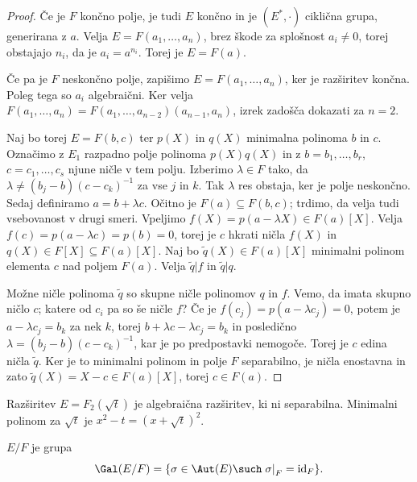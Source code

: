 \begin{proof}
  Če je $F$ končno polje, je tudi $E$ končno in je $(E^*, \cdot)$ ciklična
  grupa, generirana z $a$.
  Velja $E = F(a_1, \ldots, a_n)$, brez škode za splošnost $a_i \ne 0$, torej
  obstajajo $n_i$, da je $a_i = a^{n_i}$.
  Torej je $E = F(a)$.

  Če pa je $F$ neskončno polje, zapišimo $E = F(a_1, \ldots, a_n)$, ker je
  razširitev končna.
  Poleg tega so $a_i$ algebraični.
  Ker velja $F(a_1, \ldots, a_n) = F(a_1, \ldots, a_{n-2})(a_{n-1}, a_n)$, izrek
  zadošča dokazati za $n = 2$.

  Naj bo torej $E = F(b, c)$ ter $p(X)$ in $q(X)$ minimalna polinoma $b$ in $c$.
  Označimo z $E_1$ razpadno polje polinoma $p(X) q(X)$ in z $b = b_1, \ldots,
  b_r$, $c = c_1, \ldots, c_s$ njune ničle v tem polju.
  Izberimo $\lambda \in F$ tako, da $\lambda \ne (b_j - b){(c - c_k)}^{-1}$ za vse
  $j$ in $k$.
  Tak $\lambda$ res obstaja, ker je polje neskončno.
  Sedaj definiramo $a = b + \lambda c$.
  Očitno je $F(a) \subseteq F(b, c)$; trdimo, da velja tudi vsebovanost v drugi
  smeri.
  Vpeljimo $f(X) = p(a - \lambda X) \in F(a)[X]$.
  Velja $f(c) = p(a - \lambda c) = p(b) = 0$, torej je $c$ hkrati ničla $f(X)$
  in $q(X) \in F[X] \subseteq F(a)[X]$.
  Naj bo $\tilde{q}(X) \in F(a)[X]$ minimalni polinom elementa $c$ nad poljem
  $F(a)$.
  Velja $\tilde{q} | f$ in $\tilde{q} | q$.

  Možne ničle polinoma $\tilde{q}$ so skupne ničle polinomov $q$ in $f$.
  Vemo, da imata skupno ničlo $c$; katere od $c_i$ pa so še ničle $f$?
  Če je $f(c_j) = p(a - \lambda c_j) = 0$, potem je $a - \lambda c_j = b_k$ za
  nek $k$, torej $b + \lambda c - \lambda c_j = b_k$ in posledično $\lambda =
  (b_j - b){(c - c_k)}^{-1}$, kar je po predpostavki nemogoče.
  Torej je $c$ edina ničla $\tilde{q}$.
  Ker je to minimalni polinom in polje $F$ separabilno, je ničla enostavna in
  zato $\tilde{q}(X) = X-c \in F(a)[X]$, torej $c \in F(a)$.
\end{proof}

\begin{primer}
  Razširitev $E = F_2(\sqrt{t})$ je algebraična razširitev, ki ni separabilna.
  Minimalni polinom za $\sqrt{t}$ je $x^2 - t = {(x + \sqrt{t})}^2$.
\end{primer}


\begin{definicija}
   $E/F$ je grupa
  \[
	\Gal(E/F) = \{\sigma \in \Aut(E) \such \left. \sigma \right|_F =
	\operatorname{id}_F\}.
  \]
\end{definicija}

